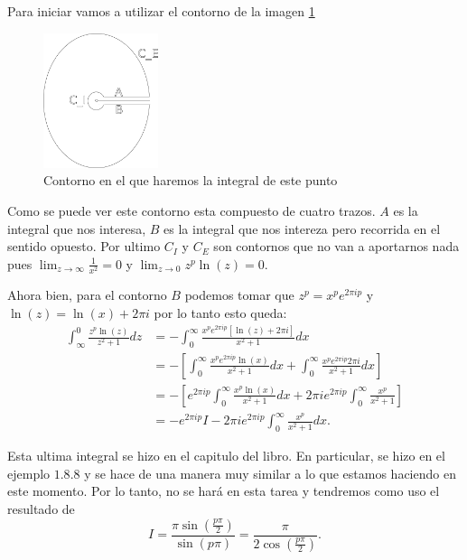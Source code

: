 \documentclass{report}
\begin{document}
Para iniciar vamos a utilizar el contorno de la imagen \ref{fig:fig3}
\begin{figure}[H]
  \centering
  \includegraphics[width=0.3\textwidth]{img/fig3.png}
  \caption{Contorno en el que haremos la integral de este punto}
  \label{fig:fig3}
\end{figure}

Como se puede ver este contorno esta compuesto de cuatro trazos. $A$ es la integral que nos interesa, $B$ es la integral que nos intereza pero recorrida en el sentido opuesto. Por ultimo $C_I$ y $C_E$ son contornos que no van a aportarnos nada pues $\displaystyle\lim_{z \to \infty} \frac{1}{x^2} = 0$ y $\displaystyle\lim_{z \to 0} z^{p}\ln\left( z \right) = 0$.

Ahora bien, para el contorno $B$ podemos tomar que $z^{p} = x^{p}e^{2\pi i p}$ y $\ln\left( z \right) = \ln\left( x \right) + 2 \pi i$ por lo tanto esto queda:
\begin{align*}
  \int_{\infty}^{0} \frac{z^{p}\ln\left( z \right) }{z^2 + 1}dz &= - \int_0^{\infty} \frac{x^{p}e^{2\pi i p}\left[ \ln\left( z \right) + 2\pi i \right] }{x^2 + 1}dx \\
  &= -\left[ \int_{0}^{\infty}\frac{x^{p}e^{2\pi i p}\ln\left( x \right) }{x^2 + 1}  dx +  \int_{0}^{\infty} \frac{x^{p}e^{2 \pi i p}2 \pi i}{x^2 + 1} dx\right]\\
  &= -\left[ e^{2\pi i p}\int_{0}^{\infty}\frac{x^{p}\ln\left( x \right) }{x^2 + 1}dx + 2\pi i e^{2 \pi i p}\int_{0}^{\infty}\frac{x^{p}}{x^2 + 1} \right]  \\
  &= -e^{2\pi i p}I - 2\pi ie^{2 \pi i p}\int_{0}^{\infty} \frac{x^{p}}{x^2 + 1}dx
.\end{align*}

Esta ultima integral se hizo en el capitulo del libro. En particular, se hizo en el ejemplo $1.8.8$ y se hace de una manera muy similar a lo que estamos haciendo en este momento. Por lo tanto, no se hará en esta tarea y tendremos como uso el resultado de \[I = \frac{\pi\sin\left( \frac{p\pi}{2} \right) }{\sin\left( p\pi \right) } = \frac{\pi}{2\cos\left( \frac{p\pi}{2} \right) }.\]
\end{document}
